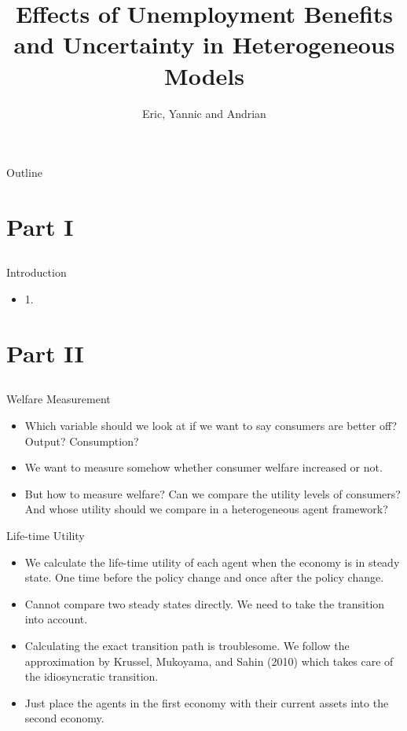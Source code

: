 \documentclass{beamer}
\title{Effects of Unemployment Benefits and Uncertainty in Heterogeneous Models}
\subtitle{}
\author{Eric, Yannic and Andrian}
\begin{document}
\begin{frame}
  \titlepage
\end{frame}

\begin{frame}{Outline}
  \tableofcontents
\end{frame}

\section{Part I}
\subsection{}
\begin{frame}{Introduction}
  \begin{itemize}

  \item {1.}
  \end{itemize}
\end{frame}
\section{Part II}
\subsection{}
\begin{frame}{Welfare Measurement}
  \begin{itemize}
  \item {
  Which variable should we look at if we want to say consumers are better off? Output? Consumption?
  }
  \item {
  We want to measure somehow whether consumer welfare increased or not.
  }
  \item {
  But how to measure welfare? Can we compare the utility levels of consumers? And whose utility should we compare in a heterogeneous agent framework?
  }
  \end{itemize}
\end{frame}

\begin{frame}{Life-time Utility}
  \begin{itemize}
  \item {
  We calculate the life-time utility of each agent when the economy is in steady state. One time before the policy change and once after the policy change.
  }
  \item {
  Cannot compare two steady states directly. We need to take the transition into account.
  }
  \item {
  Calculating the exact transition path is troublesome. We follow the approximation by Krussel, Mukoyama, and Sahin (2010) which takes care of the idiosyncratic transition.
  }
  \item {
  Just place the agents in the first economy with their current assets into the second economy.
  }
  \end{itemize}
\end{frame}
\end{document}
